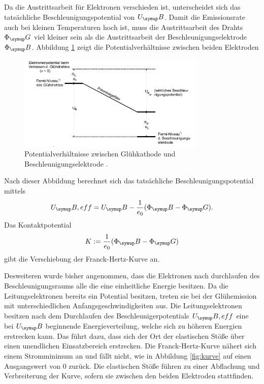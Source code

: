 Da die Austrittsarbeit für Elektronen verschieden ist, unterscheidet sich das
tatsächliche Beschleunigungspotential von $U_\su{B}$.
Damit die Emissionsrate auch bei kleinen Temperaturen hoch ist, muss die
Austrittsarbeit des Drahts $\Phi_\su{G}$ viel kleiner sein als die
Austrittsarbeit der Beschleunigungselektrode $\Phi_\su{B}$.
\newpage
Abbildung \ref{fig:pot} zeigt die Potentialverhältnisse zwischen beiden Elektroden
\begin{figure}
  \centering
  \includegraphics[width=0.8\textwidth]{bilder/potential.pdf}
  \caption{Potentialverhältnisse zwischen Glühkathode und Beschleunigungselektrode
  \cite{601}.}
  \label{fig:pot}
\end{figure}
Nach dieser Abbildung berechnet sich das tatsächliche Beschleunigungspotential
mittels
\begin{equation}
  U_\su{B,eff}=U_\su{B}-\frac{1}{e_0}(\Phi_\su{B}-\Phi_\su{G}).
\end{equation}
Das Kontaktpotential
\begin{equation}
  K:= \frac{1}{e_0}(\Phi_\su{B}-\Phi_\su{G})
\end{equation}
gibt die Verschiebung der Franck-Hertz-Kurve an.

Desweiteren wurde bisher angenommen, dass die Elektronen nach durchlaufen des
Beschleunigungsraums alle die eine einheitliche Energie besitzen. Da die
Leitungselektronen bereits ein Potential besitzen, treten sie bei der
Glühemission mit unterschiedlichen Anfangsgeschwindigkeiten aus.
Die Leitungselektronen besitzen nach dem Durchlaufen des Beschleunigerpotentials $U_\su{B,eff}$
eine bei $U_\su{B}$ beginnende Energieverteilung, welche sich zu höheren Energien erstrecken kann.
Das führt dazu, dass sich der Ort der elastischen
Stöße über einen unendlichen Einsatzbereich erstrecken. Die Franck-Hertz-Kurve nähert sich einem
Stromminimum an und fällt nicht, wie in Abbildung \ref{fig:kurve} auf einen Ausgangswert von $0$
zurück.
Die elastischen Stöße führen zu einer Abflachung und Verbreiterung
der Kurve, sofern sie zwischen den beiden Elektroden stattfinden.


